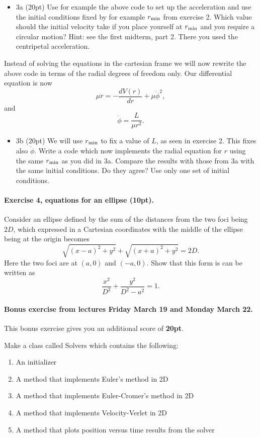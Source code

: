 \documentclass[%
oneside,                 %
final,                   %
10pt]{article}
\begin{document}
\begin{itemize}
\item 3a (20pt) Use for example the above code to set up the acceleration and use the initial conditions fixed by for example $r_{\rm min}$ from exercise 2. Which value should the initial velocity take if you place yourself at $r_{\rm min}$ and you require a circular motion? Hint: see the first midterm, part 2. There you used the centripetal acceleration.  
\end{itemize}

\noindent
Instead of solving the equations in the cartesian frame we will now rewrite the above code in terms of the radial degrees of freedom only. Our differential equation is now
\[
\mu \ddot{r}=-\frac{dV(r)}{dr}+\mu\dot{\phi}^2,
\]
and
\[
\dot{\phi}=\frac{L}{\mu r^2}.
\]

\begin{itemize}
\item 3b (20pt) We will use $r_{\rm min}$ to fix a value of $L$, as seen in exercise 2. This fixes also $\dot{\phi}$. Write a code which now implements the radial equation for $r$ using the same $r_{\rm min}$ as you did in 3a. Compare the results with those from 3a with the same initial conditions. Do they agree? Use only one set of initial conditions.
\end{itemize}

\noindent
\paragraph{Exercise 4, equations for an ellipse (10pt).}
Consider an ellipse defined by the sum of the distances from the two foci being $2D$, which expressed in a Cartesian coordinates with the middle of the ellipse being at the origin becomes
\[
\sqrt{(x-a)^2+y^2}+\sqrt{(x+a)^2+y^2}=2D.
\]
Here the two foci are at $(a,0)$ and $(-a,0)$. Show that this form is can be written as
\[
\frac{x^2}{D^2}+\frac{y^2}{D^2-a^2}=1.
\]




\paragraph{Bonus exercise from lectures Friday March 19 and Monday March 22.}
This bonus exercise gives you an additional score of \textbf{20pt}.

Make a class called Solvers which contains the following:
\begin{enumerate}
\item An initializer

\item A method that implements Euler's method in 2D

\item A method that implements Euler-Cromer's method in 2D

\item A method that implements Velocity-Verlet in 2D

\item A method that plots position versus time results from the solver
\end{enumerate}
\end{document}
